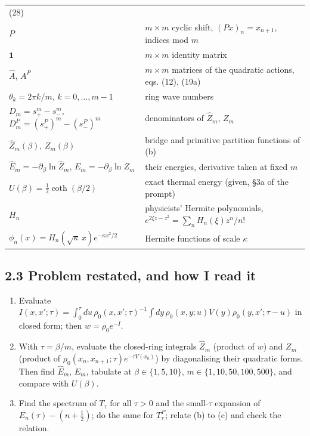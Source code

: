 \documentclass[11pt,a4paper]{article}
\begin{document}
\begin{longtable}[]{@{}
  >{\raggedright\arraybackslash}p{}
  >{\raggedright\arraybackslash}p{}@{}}
(28) \\
\(P\) & \(m\times m\) cyclic shift, \((Px)_n = x_{n+1}\), indices mod
\(m\) \\
\(\mathbf 1\) & \(m\times m\) identity matrix \\
\(\hat A\), \(A^P\) & \(m\times m\) matrices of the quadratic actions,
eqs. (12), (19a) \\
\(\theta_k = 2\pi k/m\), \(k = 0,\dots,m-1\) & ring wave numbers \\
\(D_m = s_+^m - s_-^m\), \(D^P_m = (s^P_+)^m - (s^P_-)^m\) &
denominators of \(\hat Z_m\), \(Z_m\) \\
\(\hat Z_m(\beta)\), \(Z_m(\beta)\) & bridge and primitive partition
functions of (b) \\
\(\hat E_m = -\partial_\beta\ln\hat Z_m\),
\(E_m = -\partial_\beta\ln Z_m\) & their energies, derivative taken at
fixed \(m\) \\
\(U(\beta) = \tfrac12\coth(\beta/2)\) & exact thermal energy (given, §3a
of the prompt) \\
\(H_n\) & physicists' Hermite polynomials,
\(e^{2\xi z - z^2} = \sum_n H_n(\xi)z^n/n!\) \\
\(\phi_n(x) = H_n(\sqrt\kappa\,x)e^{-\kappa x^2/2}\) & Hermite functions
of scale \(\kappa\) \\
\end{longtable}

\hypertarget{problem-restated-and-how-i-read-it}{%
\subsection{2.3 Problem restated, and how I read
it}\label{problem-restated-and-how-i-read-it}}

\begin{enumerate}
\def\labelenumi{(\alph{enumi})}
\item
  Evaluate
  \(I(x,x';\tau) = \int_0^\tau du\,\rho_0(x,x';\tau)^{-1}\int dy\,\rho_0(x,y;u)V(y)\rho_0(y,x';\tau-u)\)
  in closed form; then \(w = \rho_0 e^{-I}\).
\item
  With \(\tau = \beta/m\), evaluate the closed-ring integrals
  \(\hat Z_m\) (product of \(w\)) and \(Z_m\) (product of
  \(\rho_0(x_n,x_{n+1};\tau)e^{-\tau V(x_n)}\)) by diagonalising their
  quadratic forms. Then find \(\hat E_m\), \(E_m\), tabulate at
  \(\beta\in\{1,5,10\}\), \(m\in\{1,10,50,100,500\}\), and compare with
  \(U(\beta)\).
\item
  Find the spectrum of \(T_\tau\) for all \(\tau>0\) and the
  small-\(\tau\) expansion of \(E_n(\tau) - (n+\tfrac12)\); do the same
  for \(T^P_\tau\); relate (b) to (c) and check the relation.
\end{enumerate}
\end{document}

